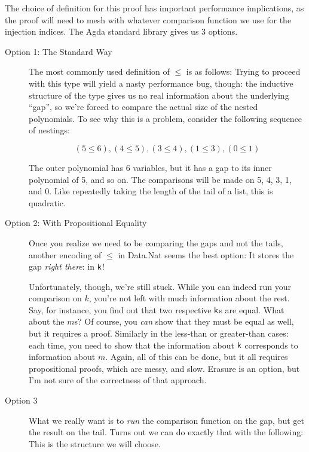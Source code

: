 \documentclass[draft, twocolumn]{article}
\theoremstyle{definition}
\theoremstyle{definition}
\begin{document}
The choice of definition for this proof has important performance implications,
as the proof will need to mesh with whatever comparison function we use for the
injection indices. The Agda standard library\cite{danielsson_agda_2018} gives us
3 options.
\begin{description}
  \item[Option 1: The Standard Way] The most commonly used definition of
    \(\leq\) is as follows:
    Trying to proceed with this type will yield a nasty performance bug, though:
    the inductive structure of the type gives us no real information about the
    underlying ``gap'', so we're forced to compare the actual size of the
    nested polynomials. To see why this is a problem, consider the following
    sequence of nestings:

    \[ (5 ≤ 6), (4 ≤ 5), (3 ≤ 4), (1 ≤ 3), (0 ≤ 1) \]

    The outer polynomial has 6 variables, but it has a gap to its inner
    polynomial of 5, and so on. The comparisons will be made on 5, 4, 3, 1, and
    0. Like repeatedly taking the length of the tail of a list, this is
    quadratic.
  \item[Option 2: With Propositional Equality] Once you realize we need to be
    comparing the gaps and not the tails, another encoding of \(\leq\) in
    Data.Nat seems the best option:
    It stores the gap \emph{right there}: in \(\AgdaField{k}\)!

    Unfortunately, though, we're still stuck. While you can indeed run your
    comparison on \(k\), you're not left with much information about the rest.
    Say, for instance, you find out that two respective \(\AgdaField{k}\)s are
    equal. What about the \(m\)s? Of course, you \emph{can} show that they must
    be equal as well, but it requires a proof. Similarly in the less-than or
    greater-than cases: each time, you need to show that the information about
    \(\AgdaField{k}\) corresponds to information about \(m\). Again, all of this
    can be done, but it all requires propositional proofs, which are messy, and
    slow. Erasure is an option, but I'm not sure of the correctness of that
    approach.
  \item[Option 3] What we really want is to \emph{run} the comparison function
    on the gap, but get the result on the tail. Turns out we can do exactly that
    with the following:
    This is the structure we will choose.
\end{description}
\end{document}
